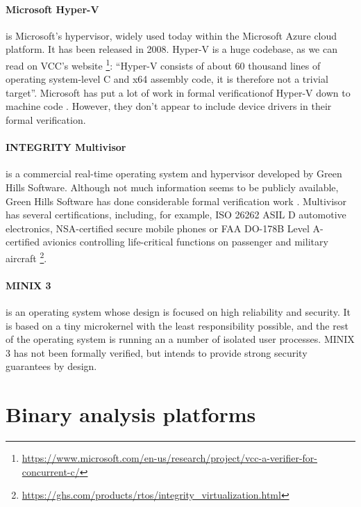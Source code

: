 \documentclass{kththesis}
\begin{document}
\paragraph{Microsoft Hyper-V} is Microsoft's hypervisor, widely used today within the Microsoft Azure cloud platform. It has been released in 2008. Hyper-V is a huge codebase, as we can read on VCC's website \footnote{\url{https://www.microsoft.com/en-us/research/project/vcc-a-verifier-for-concurrent-c/}}: ``Hyper-V consists of about 60 thousand lines of operating system-level C and x64 assembly code, it is therefore not a trivial target''. Microsoft has put a lot of work in formal verification\footnotemark of Hyper-V down to machine code \cite{leinenbach_verifying_2009}. However, they don't appear to include device drivers in their formal verification.


\paragraph{INTEGRITY Multivisor} is a commercial real-time operating system and hypervisor developed by Green Hills Software. Although not much information seems to be publicly available, Green Hills Software has done considerable formal verification work \cite{richards_modeling_2010}. Multivisor has several certifications, including, for example, ISO 26262 ASIL D automotive electronics, NSA-certified secure mobile phones or FAA DO-178B Level A-certified avionics controlling life-critical functions on passenger and military aircraft \footnote{\url{https://ghs.com/products/rtos/integrity_virtualization.html}}.

\paragraph{MINIX 3} is an operating system whose design is focused on high reliability and security. It is based on a tiny microkernel with the least responsibility possible, and the rest of the operating system is running an a number of isolated user processes. MINIX 3 has not been formally verified, but intends to provide strong security guarantees by design.

\section{Binary analysis platforms}
\end{document}
